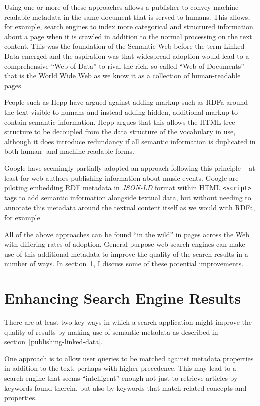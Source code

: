 Using one or more of these approaches allows a publisher to convey
machine-readable metadata in the same document that is served to humans.
This allows, for example, search engines to index more categorical and
structured information about a page when it is crawled in addition to the
normal processing on the text content. This was the foundation of the
Semantic Web\cite{berners2001semantic} before the term Linked Data
emerged and the aspiration was that widespread adoption would lead to
a comprehensive ``Web of Data'' to rival the rich, so-called
``Web of Documents'' that is the World Wide Web as we know it as a collection
of human-readable pages.

People such as Hepp have argued against adding markup such as RDFa around
the text visible to humans and instead adding hidden, additional markup to
contain semantic information.\cite{hepp2009rdf2rdfa} Hepp argues that
this allows the HTML tree structure to be decoupled from the data structure
of the vocabulary in use, although it does introduce redundancy if all
semantic information is duplicated in both human- and machine-readable forms.

Google have seemingly partially adopted an approach following this principle
-- at least for web authors publishing information about music
events.\cite{googlejsonld} Google are piloting embedding RDF metadata in
\emph{JSON-LD} format within HTML \texttt{<script>} tags to add semantic
information alongside textual data, but without needing to annotate this metadata
around the textual content itself as we would with RDFa, for example.

All of the above approaches can be found ``in the wild'' in pages across
the Web with differing rates of adoption.\cite{haas2011enhanced}
General-purpose web search
engines can make use of this additional metadata to improve the quality
of the search results in a number of ways. In section~\ref{enhancing-results},
I discuss some of these potential improvements.

\section{Enhancing Search Engine Results}
\label{enhancing-results}

There are at least two key ways in which a search application might
improve the quality of results by making use of semantic metadata as
described in section~\ref{publishing-linked-data}.

One approach is to allow
user queries to be matched against metadata properties in addition
to the text, perhaps with higher precedence. This may lead to a search
engine that seems ``intelligent'' enough not just to retrieve articles
by keywords found therein, but also by keywords that match related
concepts and properties.

